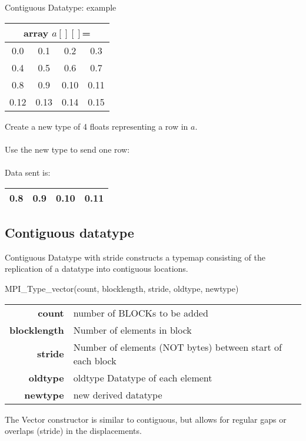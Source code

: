 \documentclass[aspectratio=43]{beamer}
\begin{document}
\begin{frame}[fragile]{Contiguous Datatype: example}
\begin{center}
\begin{tabular}{|c|c|c|c|}
    \multicolumn{4}{c}{array $a[][]$=}\\\hline
0.0  & 0.1  & 0.2  & 0.3\\\hline
0.4  & 0.5  & 0.6  & 0.7\\\hline
0.8  & 0.9  & 0.10 & 0.11\\\hline
0.12 & 0.13 & 0.14 & 0.15\\\hline
\end{tabular}
\end{center}
Create a new type of 4 floats representing a row in $a$.\\
\\[0.5cm]
Use the new type to send one row:\\
\\[0.5cm]
Data sent is:
\begin{tabular}{|c|c|c|c|}
\hline
\color{cscsblue}0.8  & \color{cscsblue}0.9  & \color{cscsblue}0.10 & \color{cscsblue}0.11\\
\hline
\end{tabular}

\end{frame}

\subsection{Contiguous datatype}
\begin{frame}[fragile]{Contiguous Datatype with stride}
 constructs a typemap consisting of the replication of a datatype into contiguous locations.
\begin{Pseudolisting}[]{}
MPI_Type_vector(count, blocklength, stride, 
                oldtype, newtype)
\end{Pseudolisting}
\begin{black1block}{}
\begin{tabular}{rp{7.5cm}}
\textbf{count} & number of BLOCKs to be added\\
\textbf{blocklength} & Number of elements in block\\
\textbf{stride} & Number of elements (NOT bytes) between start of each block\\
\textbf{oldtype} & oldtype Datatype of each element\\
\textbf{newtype} & new derived datatype\\
\end{tabular}
\end{black1block}
The Vector constructor is similar to contiguous, but allows for regular gaps or overlaps (stride) in the displacements.
\end{frame}
\end{document}
